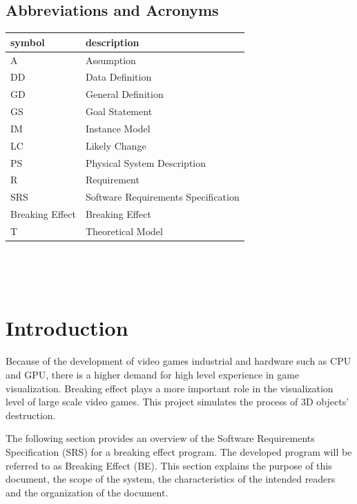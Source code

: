\documentclass[12pt]{article}
\newcommand{\progname}{Breaking Effect} %
\begin{document}
	\subsection{Abbreviations and Acronyms}
	
	\renewcommand{\arraystretch}{1.2}
	\begin{tabular}{l l} 
		\toprule		
		\textbf{symbol} & \textbf{description}\\
		\midrule 
		A & Assumption\\
		DD & Data Definition\\
		GD & General Definition\\
		GS & Goal Statement\\
		IM & Instance Model\\
		LC & Likely Change\\
		PS & Physical System Description\\
		R & Requirement\\
		SRS & Software Requirements Specification\\
		\progname{} & Breaking Effect\\
		T & Theoretical Model\\
		\bottomrule
	\end{tabular}\\
	
	\newpage
	
	\tableofcontents
	
	~\newpage
	
	
	\section{Introduction}
	
	Because of the development of video games industrial and hardware such as CPU
	and GPU, there is a higher demand for high level experience in game
	visualization. Breaking effect plays a more important role in the visualization
	level of large scale video games.   This project simulates the process of 3D objects’ destruction.
	
	The following section provides an overview of the Software Requirements Specification (SRS) for a breaking effect program. The developed program will be referred to as Breaking Effect (BE). This section explains the purpose of this document, the scope of the system, the characteristics of the intended readers and the organization of the document.
	
\end{document}
